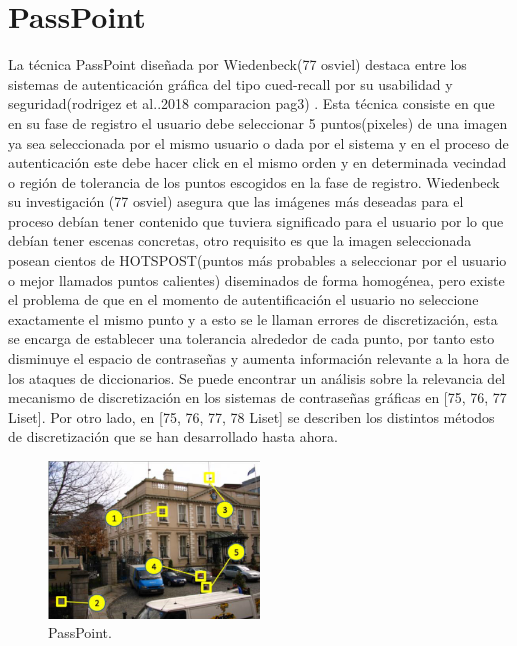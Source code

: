 \documentclass[12pt]{report}
\begin{document}
\section{PassPoint}
	La técnica PassPoint diseñada por Wiedenbeck(77 osviel) destaca entre los sistemas de autenticación gráfica del tipo cued-recall por su usabilidad y seguridad(rodrigez et al..2018 comparacion pag3) .
	Esta técnica consiste en que  en su fase de registro el
	usuario debe seleccionar 5 puntos(pixeles) de una imagen ya sea seleccionada por el mismo usuario o dada por el sistema  y en el proceso de autenticación este debe hacer click en el mismo orden y en determinada  vecindad o región de tolerancia de los puntos escogidos en la fase de registro.
	Wiedenbeck su investigación (77 osviel) asegura que las imágenes más deseadas para el proceso debían tener contenido que tuviera significado para el usuario por lo que debían tener escenas concretas, otro requisito es que la imagen seleccionada posean cientos de HOTSPOST(puntos más probables a seleccionar por el usuario o mejor llamados puntos calientes) diseminados de forma homogénea, pero existe el problema de que en el momento de autentificación el usuario no seleccione exactamente el mismo punto y a esto se le llaman errores de discretización, esta se encarga de establecer una tolerancia alrededor de cada punto, por tanto esto disminuye el espacio de contraseñas y aumenta información relevante a la hora de los ataques de diccionarios. Se puede encontrar un análisis sobre la relevancia del mecanismo de discretización en los sistemas de contraseñas gráficas en [75, 76, 77 Liset]. Por otro lado, en [75, 76, 77, 78 Liset] se describen los distintos métodos de discretización que se han desarrollado hasta ahora.\\
	\begin{figure}[ht]
		\centering
		\includegraphics[width=0.5\textwidth]{passpoint.png}
		\caption{PassPoint.}
		\label{fig:PassPoint}
	\end{figure}
	
\end{document}
